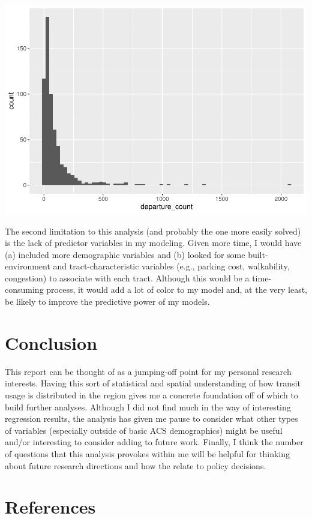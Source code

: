 \documentclass[
]{article}
\begin{document}
\includegraphics{transit-hotspots-PSRC_files/figure-latex/unnamed-chunk-17-1.pdf}

The second limitation to this analysis (and probably the one more easily
solved) is the lack of predictor variables in my modeling. Given more
time, I would have (a) included more demographic variables and (b)
looked for some built-environment and tract-characteristic variables
(e.g., parking cost, walkability, congestion) to associate with each
tract. Although this would be a time-consuming process, it would add a
lot of color to my model and, at the very least, be likely to improve
the predictive power of my models.

\section{Conclusion}\label{conclusion}

This report can be thought of as a jumping-off point for my personal
research interests. Having this sort of statistical and spatial
understanding of how transit usage is distributed in the region gives me
a concrete foundation off of which to build further analyses. Although I
did not find much in the way of interesting regression results, the
analysis has given me pause to consider what other types of variables
(especially outside of basic ACS demographics) might be useful and/or
interesting to consider adding to future work. Finally, I think the
number of questions that this analysis provokes within me will be
helpful for thinking about future research directions and how the relate
to policy decisions.

\section{References}\label{references}
\end{document}

